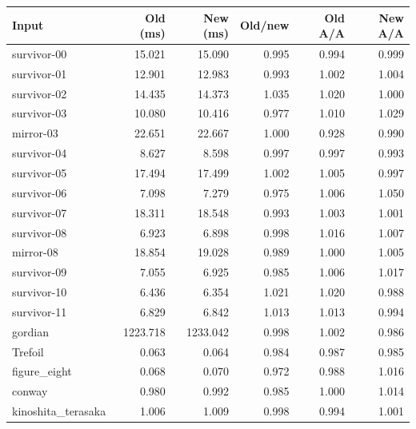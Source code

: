 \begin{tabular}{lrrrrr}
\toprule
Input & Old (ms) & New (ms) & Old/new & Old A/A & New A/A \\
\midrule
survivor-00 & 15.021 & 15.090 & 0.995 & 0.994 & 0.999 \\
survivor-01 & 12.901 & 12.983 & 0.993 & 1.002 & 1.004 \\
survivor-02 & 14.435 & 14.373 & 1.035 & 1.020 & 1.000 \\
survivor-03 & 10.080 & 10.416 & 0.977 & 1.010 & 1.029 \\
mirror-03 & 22.651 & 22.667 & 1.000 & 0.928 & 0.990 \\
survivor-04 & 8.627 & 8.598 & 0.997 & 0.997 & 0.993 \\
survivor-05 & 17.494 & 17.499 & 1.002 & 1.005 & 0.997 \\
survivor-06 & 7.098 & 7.279 & 0.975 & 1.006 & 1.050 \\
survivor-07 & 18.311 & 18.548 & 0.993 & 1.003 & 1.001 \\
survivor-08 & 6.923 & 6.898 & 0.998 & 1.016 & 1.007 \\
mirror-08 & 18.854 & 19.028 & 0.989 & 1.000 & 1.005 \\
survivor-09 & 7.055 & 6.925 & 0.985 & 1.006 & 1.017 \\
survivor-10 & 6.436 & 6.354 & 1.021 & 1.020 & 0.988 \\
survivor-11 & 6.829 & 6.842 & 1.013 & 1.013 & 0.994 \\
gordian & 1223.718 & 1233.042 & 0.998 & 1.002 & 0.986 \\
Trefoil & 0.063 & 0.064 & 0.984 & 0.987 & 0.985 \\
figure\_eight & 0.068 & 0.070 & 0.972 & 0.988 & 1.016 \\
conway & 0.980 & 0.992 & 0.985 & 1.000 & 1.014 \\
kinoshita\_terasaka & 1.006 & 1.009 & 0.998 & 0.994 & 1.001 \\
\bottomrule
\end{tabular}
